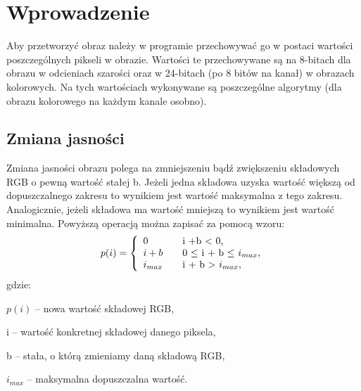 \documentclass{classrep}
\begin{document}
\section{Wprowadzenie}
Aby przetworzyć obraz należy w programie przechowywać go w postaci wartości poszczególnych pikseli w obrazie. Wartości te przechowywane są na 8-bitach dla obrazu w odcieniach szarości oraz w 24-bitach (po 8 bitów na kanał) w obrazach kolorowych. Na tych wartościach wykonywane są poszczególne algorytmy (dla obrazu kolorowego na każdym kanale osobno).

\subsection{Zmiana jasności}
Zmiana jasności obrazu polega na zmniejszeniu bądź zwiększeniu składowych RGB o pewną wartość stałej b. Jeżeli jedna składowa uzyska wartość większą od dopuszczalnego zakresu to wynikiem jest wartość maksymalna z tego zakresu. Analogicznie, jeżeli składowa ma wartość mniejszą to wynikiem jest wartość minimalna. Powyższą operacją można zapisać za pomocą wzoru:
\begin{equation}
p(i)=\left\{
\begin{array}{l l l}
0 & \quad \mbox{i +b $<$ 0,} \\
i+b & \quad \mbox{0 $\leq$ i + b $\leq$  $i_{max}$,} \\
i_{max} & \quad \mbox{i + b $>$ $i_{max}$,} \\
\end{array}
\right.
\end{equation}
gdzie:
\begin{description}
\item $p(i)$ -- nowa wartość składowej RGB,
\item i -- wartość konkretnej składowej danego piksela,
\item b -- stała, o którą zmieniamy daną składową RGB,
\item $i_{max}$ -- maksymalna dopuszczalna wartość.
\end{description}
\end{document}

